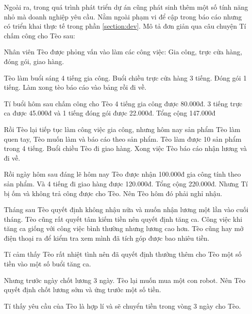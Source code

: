 Ngoài ra, trong quá trình phát triển dự án cũng phát sinh thêm một số tính năng nhỏ mà doanh nghiệp yêu cầu. Nằm ngoài phạm vi để cập trong báo cáo nhưng có triển khai thực tế trong phần \ref{section:dev}. Mô tả đơn giản qua câu chuyện Tí chấm công cho Tèo sau:

Nhân viên Tèo được phỏng vấn vào làm các công việc: Gia công, trực cửa hàng, đóng gói, giao hàng.

Tèo làm buổi sáng 4 tiếng gia công. Buổi chiều trực cửa hàng 3 tiếng. Đóng gói 1 tiếng. Làm xong tèo báo cáo vào bảng
rồi đi về.

Tí buổi hôm sau chấm công cho Tèo 4 tiếng gia công được 80.000đ. 3 tiếng trực ca được 45.000đ và 1 tiếng đóng gói được
22.000đ. Tổng cộng 147.000đ

Rồi Tèo lại tiếp tục làm công việc gia công, nhưng hôm nay sản phẩm Tèo làm quen tay, Tèo muốn làm và báo cáo theo sản
phẩm. Tèo làm được 10 sản phẩm trong 4 tiếng. Buổi chiều Tèo đi giao hàng. Xong việc Tèo báo cáo nhận lương và đi về.

Rồi ngày hôm sau đáng lẽ hôm nay Tèo được nhận 100.000đ gia công tính theo sản phẩm. Và 4 tiếng đi giao hàng được
120.000đ. Tổng cộng 220.000đ. Nhưng Tí bị ốm và không trả công được cho Tèo. Nên Tèo hôm đó phải nghỉ nhậu.

Tháng sau Tèo quyết định không nhậu nữa và muốn nhận lương một lần vào cuối tháng. Tèo cũng rất quyết tâm kiếm tiền nên
quyết định tăng ca. Công việc khi tăng ca giống với công việc bình thường nhưng lương cao hơn. Tèo cũng hay mở điện
thoại ra để kiểm tra xem mình đã tích góp được bao nhiêu tiền.

Tí cảm thấy Tèo rất nhiệt tình nên đã quyết định thưởng thêm cho Tèo một số tiền vào một số buổi tăng ca.

Nhưng trước ngày chốt lương 3 ngày. Tèo lại muốn mua một con robot. Nên Tèo quyết định chốt lương sớm và ứng trước một
số tiền.

Tí thấy yêu cầu của Tèo là hợp lí và sẽ chuyển tiền trong vòng 3 ngày cho Tèo.